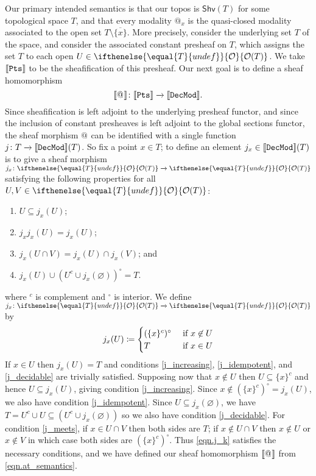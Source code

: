 \documentclass[reqno,11pt]{amsproc}
\makeatletter
\theoremstyle{plain}
\theoremstyle{definition}
\DeclarePairedDelimiter{\church}{\llbracket}{\rrbracket}
\newcommand{\cat}[1]{\mathsf{#1}}
\renewcommand{\to}[1][]{\xrightarrow{#1}}
\newcommand{\tn}[1]{\textnormal{#1}}
\newcommand{\shv}{\cat{Shv}}
\newcommand{\pt}{x}
\newcommand{\Op}[1][undef]{\ifthenelse{\equal{#1}{undef}}{\mathcal{O}}{\mathcal{O}(#1)}}
\newcommand{\pts}{\mathtt{Pts}}		%
\newcommand{\decmod}{\mathtt{DecMod}}	%
\newcommand{\atsymbol}{{@}}
\newcommand{\at}[1][\pt]{\atsymbol_{#1}}
\newcommand{\beq}{\begin{equation}}
\newcommand{\eeq}{\end{equation}}
\numberwithin{equation}{section}
\makeatother
\begin{document}
Our primary intended semantics is that our topos is $\shv(T)$ for some topological space $T$, and that every modality $\at$ is the quasi-closed modality associated to the open set $T \setminus \overline{\{\pt\}}$. More precisely, consider the underlying set $T$ of the space, and consider the associated constant presheaf on $T$, which assigns the set $T$ to each open $U\in\Op[T]$. We take $\church{\pts}$ to be the sheafification of this presheaf. Our next goal is to define a sheaf homomorphism
\beq
	\church{\at[]}\colon\church{\pts}\to\church{\decmod}.
\eeq
Since sheafification is left adjoint to the underlying presheaf functor, and since the inclusion of constant presheaves is left adjoint to the global sections functor, the sheaf morphism $\at[]$ can be identified with a single function $j\colon T\to\church{\decmod}(T)$. So fix a point $\pt\in T$;
to define an element $j_\pt\in\church{\decmod}(T)$ is to give a sheaf morphism $j_\pt\colon\Op[T]\to\Op[T]$ satisfying the following properties for all $U,V\in\Op[T]$:
\begin{enumerate}
	\item\label{j_increasing} $U\subseteq j_\pt(U)$;
	\item\label{j_idempotent} $j_\pt j_\pt(U)=j_\pt(U)$;
	\item\label{j_meets} $j_\pt(U\cap V)=j_\pt(U)\cap j_\pt(V)$; and
	\item\label{j_decidable} $j_\pt(U)\cup (U^c\cup j_\pt(\varnothing))^\circ=T$.
\end{enumerate}
where $^c$ is complement and $^\circ$ is interior. We define $j_\pt\colon\Op[T]\to\Op[T]$ by
\begin{equation}\label{eqn.j_k}
	j_\pt(U)\coloneqq
	\begin{cases}
		(\{\pt\}^c)^\circ&\tn{ if }\pt\not\in U\\
		T&\tn{ if } \pt\in U
	\end{cases}
\end{equation}
If $\pt\in U$ then $j_\pt(U)=T$ and conditions \ref{j_increasing}, \ref{j_idempotent}, and \ref{j_decidable} are trivially satisfied. Supposing now that $\pt\not\in U$ then $U\subseteq \{\pt\}^c$ and hence $U\subseteq j_\pt(U)$, giving condition \ref{j_increasing}. Since $\pt\not\in(\{\pt\}^c)^\circ=j_\pt(U)$, we also have condition \ref{j_idempotent}. Since $U\subseteq j_\pt(\varnothing)$, we have $T=U^c\cup U\subseteq (U^c\cup j_\pt(\varnothing))$ so we also have condition \ref{j_decidable}. For condition \ref{j_meets}, if $\pt\in U\cap V$ then both sides are $T$; if $\pt\not\in U\cap V$ then $\pt\not\in U$ or $\pt\not\in V$ in which case both sides are $(\{\pt\}^c)^\circ$. Thus \eqref{eqn.j_k} satisfies the necessary conditions, and we have defined our sheaf homomorphism $\church{\at[]}$ from \eqref{eqn.at_semantics}.
\end{document}
